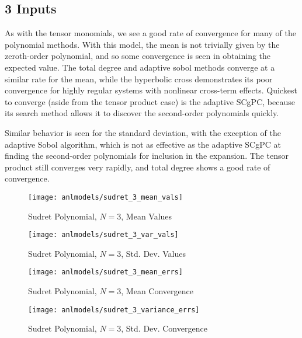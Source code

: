 \subsection{3 Inputs}
As with the tensor monomials, we see a good rate of convergence for many of the polynomial methods.  With
this model, the mean is not trivially given by the zeroth-order polynomial, and so some convergence is seen
in obtaining the expected value.  The total degree and adaptive sobol methods converge at a similar rate for
the mean, while the hyperbolic cross demonstrates its poor convergence for highly regular systems with
nonlinear cross-term effects.  Quickest to converge (aside from the tensor product case) is the adaptive
SCgPC, because its search method allows it to discover the second-order polynomials quickly.

Similar behavior is seen for the standard deviation, with the exception of the adaptive Sobol algorithm, which
is not as effective as the adaptive SCgPC at finding the second-order polynomials for inclusion in the expansion.
The tensor product still converges very rapidly, and total degree shows a good rate of convergence.
\begin{figure}[H]
  \centering
  \texttt{[image: anlmodels/sudret\_3\_mean\_vals]}
  \caption{Sudret Polynomial, $N=3$, Mean Values}
  \label{fig:sudretpoly mean values 3}
\end{figure}
\begin{figure}[H]
  \centering
  \texttt{[image: anlmodels/sudret\_3\_var\_vals]}
  \caption{Sudret Polynomial, $N=3$, Std. Dev. Values}
  \label{fig:sudretpoly var values 3}
\end{figure}

\begin{figure}[H]
  \centering
  \texttt{[image: anlmodels/sudret\_3\_mean\_errs]}
  \caption{Sudret Polynomial, $N=3$, Mean Convergence}
  \label{fig:sudretpoly mean errors 3}
\end{figure}
\begin{figure}[H]
  \centering
  \texttt{[image: anlmodels/sudret\_3\_variance\_errs]}
  \caption{Sudret Polynomial, $N=3$, Std. Dev. Convergence}
  \label{fig:sudretpoly var errors 3}
\end{figure}

